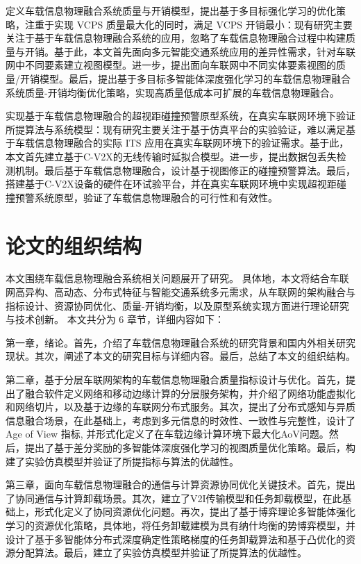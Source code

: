  定义车载信息物理融合系统质量与开销模型，提出基于多目标强化学习的优化策略，注重于实现 VCPS 质量最大化的同时，满足 VCPS 开销最小：现有研究主要关注于基于车载信息物理融合系统的应用，忽略了车载信息物理融合过程中构建质量与开销。基于此，本文首先面向多元智能交通系统应用的差异性需求，针对车联网中不同要素建立视图模型。进一步，提出面向车联网中不同实体要素视图的质量/开销模型。最后，提出基于多目标多智能体深度强化学习的车载信息物理融合系统质量-开销均衡优化策略，实现高质量低成本可扩展的车载信息物理融合。

 实现基于车载信息物理融合的超视距碰撞预警原型系统，在真实车联网环境下验证所提算法与系统模型：现有研究主要关注于基于仿真平台的实验验证，难以满足基于车载信息物理融合的实际 ITS 应用在真实车联网环境下的验证需求。基于此，本文首先建立基于C-V2X的无线传输时延拟合模型。进一步，提出数据包丢失检测机制。最后基于车载信息物理融合，设计基于视图修正的碰撞预警算法。最后，搭建基于C-V2X设备的硬件在环试验平台，并在真实车联网环境中实现超视距碰撞预警系统原型，验证了车载信息物理融合的可行性和有效性。


\section{论文的组织结构}\label{section 1-7}
本文围绕车载信息物理融合系统相关问题展开了研究。
具体地，本文将结合车联网高异构、高动态、分布式特征与智能交通系统多元需求，从车联网的架构融合与指标设计、资源协同优化、质量-开销均衡，以及原型系统实现方面进行理论研究与技术创新。
本文共分为 6 章节，详细内容如下：

第一章，绪论。首先，介绍了车载信息物理融合系统的研究背景和国内外相关研究现状。其次，阐述了本文的研究目标与详细内容。最后，总结了本文的组织结构。

第二章，基于分层车联网架构的车载信息物理融合质量指标设计与优化。首先，提出了融合软件定义网络和移动边缘计算的分层服务架构，并介绍了网络功能虚拟化和网络切片，以及基于边缘的车联网分布式服务。其次，提出了分布式感知与异质信息融合场景，在此基础上，考虑到多元信息的时效性、一致性与完整性，设计了 Age of View 指标, 并形式化定义了在车载边缘计算环境下最大化AoV问题。然后，提出了基于差分奖励的多智能体深度强化学习的视图质量优化策略。最后，构建了实验仿真模型并验证了所提指标与算法的优越性。

第三章，面向车载信息物理融合的通信与计算资源协同优化关键技术。首先，提出了协同通信与计算卸载场景。其次，建立了V2I传输模型和任务卸载模型，在此基础上，形式化定义了协同资源优化问题。再次，提出了基于博弈理论多智能体强化学习的资源优化策略，具体地，将任务卸载建模为具有纳什均衡的势博弈模型，并设计了基于多智能体分布式深度确定性策略梯度的任务卸载算法和基于凸优化的资源分配算法。最后，建立了实验仿真模型并验证了所提算法的优越性。

